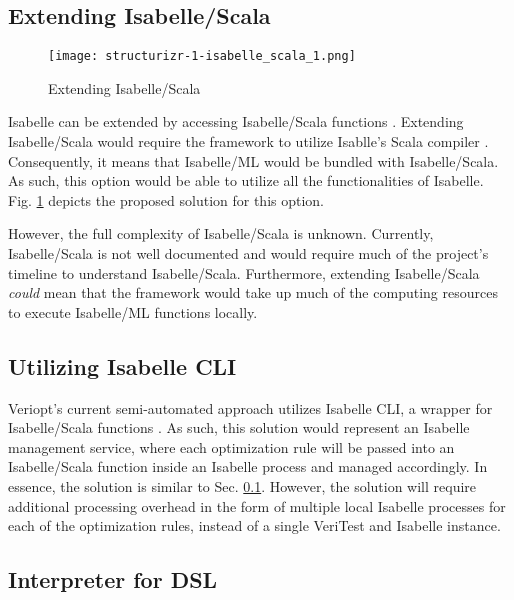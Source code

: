 \subsection{Extending Isabelle/Scala}
\label{sec:IsabelleScala}

\begin{figure}[h]
      \centering
      \texttt{[image: structurizr-1-isabelle\_scala\_1.png]}
      \caption{Extending Isabelle/Scala}
      \label{fig:IsabelleScala}
\end{figure}

Isabelle can be extended by accessing Isabelle/Scala functions \cite[Ch. 5]{isabelleSystem}. Extending Isabelle/Scala would require the framework 
to utilize Isablle's Scala compiler \cite[Ch. 5.1.4]{isabelleSystem}. Consequently, it means that Isabelle/ML would be bundled with Isabelle/Scala. 
As such, this option would be able to utilize all the functionalities of Isabelle. Fig. \ref{fig:IsabelleScala} depicts the proposed solution for 
this option.

However, the full complexity of Isabelle/Scala is unknown. Currently, Isabelle/Scala is not well documented and would require much of the 
project's timeline to understand Isabelle/Scala. Furthermore, extending Isabelle/Scala \emph{could} mean that the framework would take up 
much of the computing resources to execute Isabelle/ML functions locally.

\subsection{Utilizing Isabelle CLI}
\label{sec:IsabelleCLI}

Veriopt's current semi-automated approach \cite[Sec. 5.1]{Term_Graph_Optimizations} utilizes Isabelle CLI, a wrapper for Isabelle/Scala functions 
\cite{IsabelleHOL}. As such, this solution would represent an Isabelle management service, where each optimization rule will be passed into an 
Isabelle/Scala function inside an Isabelle process and managed accordingly. In essence, the solution is similar to Sec. \ref{sec:IsabelleScala}. 
However, the solution will require additional processing overhead in the form of multiple local Isabelle processes for each of the optimization rules, 
instead of a single VeriTest and Isabelle instance.

\subsection{Interpreter for DSL}
\label{sec:DSLInterpreter}

